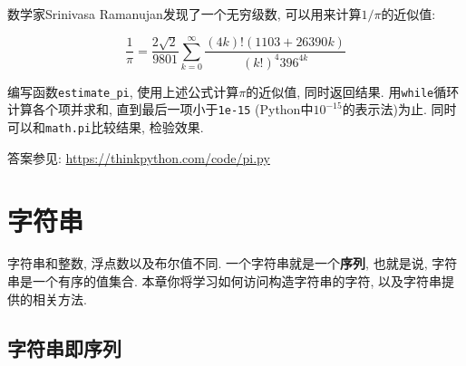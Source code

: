 \documentclass[10pt]{book}
\begin{document}
\begin{exercise}
数学家Srinivasa Ramanujan发现了一个无穷级数, 
可以用来计算$1 / \pi$的近似值:

\[ \frac{1}{\pi} = \frac{2\sqrt{2}}{9801} 
\sum^\infty_{k=0} \frac{(4k)!(1103+26390k)}{(k!)^4 396^{4k}} \]

编写函数\verb"estimate_pi", 使用上述公式计算$\pi$的近似值, 
同时返回结果. 用{\tt while}循环计算各个项并求和, 直到最后一项小于{\tt 1e-15}
(Python中$10^{-15}$的表示法)为止. 
同时可以和{\tt math.pi}比较结果, 检验效果. 

答案参见: \url{https://thinkpython.com/code/pi.py}

\end{exercise}

\chapter{字符串}
\label{strings}

字符串和整数, 浮点数以及布尔值不同. 
一个字符串就是一个{\bf 序列}, 也就是说, 字符串是一个有序的值集合. 
本章你将学习如何访问构造字符串的字符, 以及字符串提供的相关方法. 

\section{字符串即序列}
\end{document}
